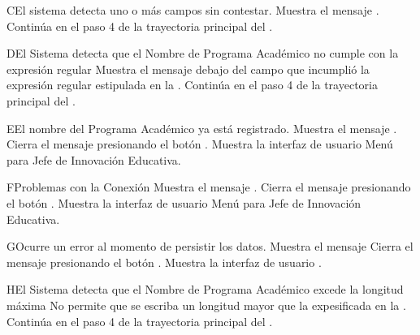 \begin{UCtrayectoriaA}{C}{El sistema detecta uno o más campos sin contestar.}
    \UCpaso Muestra el mensaje .
    \UCpaso Continúa en el paso 4 de la trayectoria principal del .
\end{UCtrayectoriaA}
\begin{UCtrayectoriaA}{D}{El Sistema detecta que el Nombre de Programa Académico no cumple con la expresión regular}
    \UCpaso Muestra el mensaje  debajo del campo que incumplió la expresión regular estipulada en la .
    \UCpaso Continúa en el paso 4 de la trayectoria principal del .
\end{UCtrayectoriaA}
\begin{UCtrayectoriaA}{E}{El nombre del Programa Académico ya está registrado.}
    \UCpaso Muestra el mensaje .
    \UCpaso[\UCactor] Cierra el mensaje presionando el botón .
\UCpaso Muestra la interfaz de usuario Menú para Jefe de Innovación Educativa.
\end{UCtrayectoriaA}
\begin{UCtrayectoriaA}{F}{Problemas con la Conexión}
    \UCpaso Muestra el mensaje .
    \UCpaso[\UCactor] Cierra el mensaje presionando el botón .
\UCpaso Muestra la interfaz de usuario Menú para Jefe de Innovación Educativa.
\end{UCtrayectoriaA}
\begin{UCtrayectoriaA}{G}{Ocurre un error al momento de persistir los datos.}
    \UCpaso Muestra el mensaje 
    \UCpaso[\UCactor] Cierra el mensaje presionando el botón .
    \UCpaso Muestra la interfaz de usuario .
\end{UCtrayectoriaA}
\begin{UCtrayectoriaA}{H}{El Sistema detecta que el Nombre de Programa Académico excede la longitud máxima}
    \UCpaso No permite que se escriba un longitud mayor que la expesificada en la .
    \UCpaso Continúa en el paso 4 de la trayectoria principal del .
\end{UCtrayectoriaA}